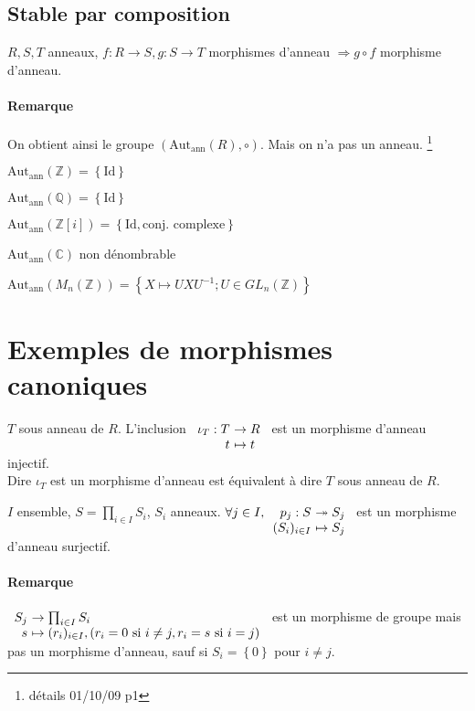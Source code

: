 \documentclass[reqno,a4paper,10pt]{report}
\makeatletter
\newcommand{\set}[1]{\left\lbrace #1 \right\rbrace} %
\newcommand{\IZ}{\ensuremath{\mathbb{Z}}\xspace} %
\newcommand{\IQ}{\ensuremath{\mathbb{Q}}\xspace} %
\newcommand{\IC}{\ensuremath{\mathbb{C}}\xspace} %
\newcommand{\so}{\Rightarrow}
\newcommand{\surj}{\twoheadrightarrow}
\newcommand{\id}{\ensuremath{\mathrm{Id}}} %
\newcommand{\pfootnote}[1]{\up{(}\footnote{#1}\up{)}} %
\newcommand{\Autann}[1]{\text{Aut}_{\text{ann}}\left(#1\right)}
\let\olditemize=\itemize%
\renewenvironment{itemize}{%
    \olditemize%
  }{%
    \@noparlisttrue%
    \endlist%
  }%
\let\oldenumerate=\enumerate%
\renewenvironment{enumerate}{%
    \oldenumerate%
  }{%
    \@noparlisttrue%
    \endlist%
  }%
\makeatother
\begin{document}
\subsection{Stable par composition}
$R, S, T$ anneaux, $f:R \to S, g: S \to T$ morphismes d'anneau $\so g\circ f$
morphisme d'anneau.

\paragraph{Remarque} On obtient ainsi le groupe $(\Autann{R}, \circ)$. Mais on
n'a pas un anneau.
  \pfootnote{détails 01/10/09 p1}
\begin{itemize}
  \item $\Autann{\IZ} = \set{\id}$
  \item $\Autann{\IQ} = \set{\id}$
  \item $\Autann{\IZ[i]} = \set{\id, \text{conj. complexe}}$
  \item $\Autann{\IC}$ non dénombrable
  \item $\Autann{M_n(\IZ)}=\set{X \mapsto UXU^{-1};U \in GL_n(\IZ)}$
\end{itemize}

\section{Exemples de morphismes canoniques}
\begin{enumerate}
  \item $T$ sous anneau de $R$. L'inclusion
    $\begin{array}[t]{r@{\ }l}
      \iota_T : T &\to R\\
      t &\mapsto t
    \end{array}$ est un morphisme d'anneau injectif.\\
    Dire $\iota_T$ est un morphisme d'anneau est équivalent à dire $T$ sous
    anneau de $R$.
  \item $I$ ensemble, $S=\prod_{i\in I}S_i$, $S_i$ anneaux.
    $\forall j \in I, \begin{array}[t]{r@{\ }l}
      p_j : S &\surj S_j \\
      (S_i)_{i\in I} &\mapsto S_j
    \end{array}$ est un morphisme d'anneau surjectif.
\end{enumerate}

\paragraph{Remarque}
$\begin{array}[t]{r@{\ }l}
  S_j &\to \prod_{i\in I} S_i\\
  s &\mapsto (r_i)_{i \in I}, (r_i = 0 \text{ si } i\neq j, r_i=s
  \text{ si } i=j)
\end{array}$ est un morphisme de groupe mais pas un morphisme d'anneau, sauf
si $S_i=\set{0}$ pour $i\neq j$.
\end{document}
